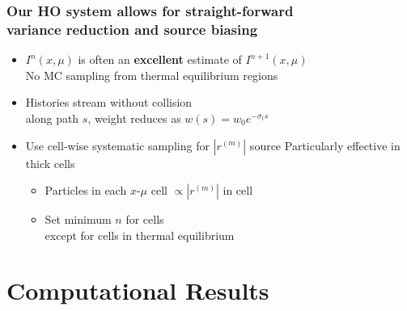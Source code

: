 \documentclass[xcolor=dvipsnames,hyperref={pdfpagelabels=false},unknownkeysallowed]{beamer}
\newcommand{\colb}[1]{{\color{blue} #1}}
\newcommand{\colG}[1]{{\color{Gray!110} #1}}
\newlength{\wideitemsep}
\let\olditem\item
\renewcommand{\item}{\setlength{\itemsep}{\wideitemsep}\olditem}
\begin{document}
\begin{frame}
    \frametitle{Our HO system allows for straight-forward \\ variance reduction and source biasing}
    \addtolength{\wideitemsep}{0.15in}
    \begin{itemize}
        \item[] $I^{n}(x,\mu)$ is often an \colb{\textbf{excellent}} estimate of
            $I^{n+1}(x,\mu)$\\  \colG{No MC sampling from thermal equilibrium regions}
        \item[] Histories stream without collision \\
            \colG{along path $s$, weight reduces as $w(s)=w_0 e^{-\sigma_t s}$}
        \item[] Use cell-wise {systematic} sampling for $|r^{(m)}|$ source
            \colG{Particularly effective in thick cells}
            \begin{itemize}
                    \vspace{0.02in}
                \item Particles in  each $x$-$\mu$ cell $\propto |r^{(m)}|$ in cell
                \vspace{-0.15in}
                \item Set minimum $n$ for cells  \\
                    \colG{except for cells in thermal equilibrium}
            \end{itemize}
    \end{itemize}
\end{frame}


\section{Computational Results}
\subsection{}
\end{document}
